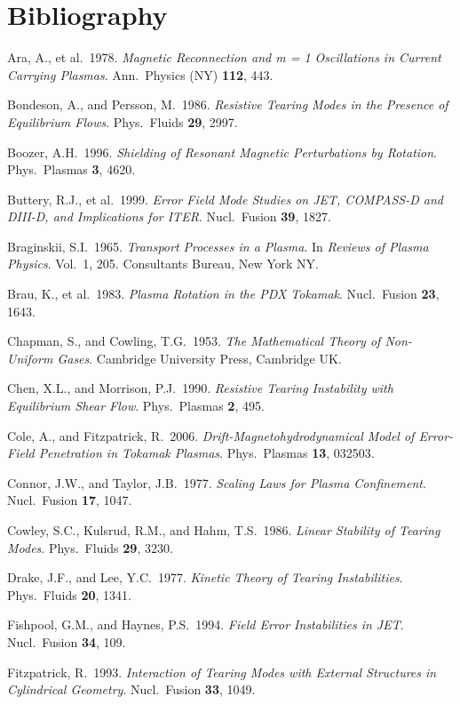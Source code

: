 \documentclass[notitlepage,12pt]{article}
\begin{document}
\section*{Bibliography}
\begin{description}
\item Ara, A., et al.\ 1978. {\em Magnetic Reconnection and m = 1 Oscillations in Current Carrying Plasmas}. Ann.\ Physics (NY) 
{\bf 112}, 443. 
\item Bondeson, A., and Persson, M.\ 1986. {\em Resistive Tearing Modes in the Presence of Equilibrium Flows}. Phys.\ Fluids
{\bf 29}, 2997. 
\item Boozer, A.H.\ 1996. {\em Shielding of Resonant Magnetic Perturbations by Rotation}. Phys.\ Plasmas {\bf 3}, 4620.
\item Buttery, R.J., et al.\ 1999. {\em Error Field Mode Studies on JET, COMPASS-D and DIII-D, and Implications for ITER}. Nucl.\ Fusion {\bf 39}, 1827. 
\item Braginskii, S.I.\ 1965. {\em Transport Processes in a Plasma}. In {\em Reviews of Plasma Physics}.  Vol.~1, 205. Consultants Bureau, New York NY. 
\item Brau, K., et al.\ 1983. {\em Plasma Rotation in the PDX Tokamak}. Nucl.\ Fusion {\bf 23}, 1643.
\item Chapman, S., and Cowling, T.G.\ 1953. {\em The Mathematical Theory of Non-Uniform Gases}. Cambridge University Press, Cambridge UK. 
\item Chen, X.L., and Morrison, P.J.\ 1990. {\em Resistive Tearing Instability with Equilibrium Shear Flow}. Phys.\ Plasmas {\bf 2}, 495. 
\item Cole, A., and Fitzpatrick, R.\ 2006. {\em Drift-Magnetohydrodynamical Model of Error-Field Penetration in Tokamak
Plasmas}. Phys.\ Plasmas {\bf 13}, 032503. 
\item Connor, J.W., and Taylor, J.B.\ 1977. {\em Scaling Laws for Plasma Confinement}. Nucl.\ Fusion {\bf 17}, 1047.
\item Cowley, S.C.,  Kulsrud, R.M., and Hahm, T.S.\ 1986. {\em Linear Stability of Tearing Modes}. Phys.\ Fluids {\bf 29}, 3230. 
\item Drake, J.F., and Lee, Y.C.\ 1977. {\em Kinetic Theory of Tearing Instabilities}. Phys.\ Fluids {\bf 20}, 1341.
\item Fishpool, G.M., and Haynes, P.S.\ 1994. {\em Field Error Instabilities in JET}. Nucl.\ Fusion {\bf 34}, 109. 
\item Fitzpatrick, R.\ 1993. {\em Interaction of Tearing Modes with External Structures in Cylindrical Geometry}. Nucl.\ Fusion {\bf 33}, 1049. 

\end{description}
\end{document}
